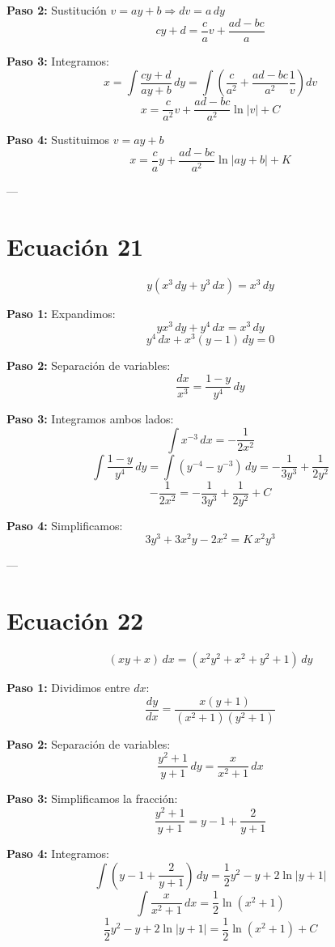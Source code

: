 \documentclass[12pt,a4paper]{article}
\begin{document}
\begin{multicols}{2}
	\textbf{Paso 2:} Sustitución \(v = a y + b \Rightarrow dv = a\,dy\)
	\[
	c y + d = \frac{c}{a}v + \frac{ad - bc}{a}
	\]
	
	\textbf{Paso 3:} Integramos:
	\[
	x = \int \frac{c y + d}{a y + b}\,dy 
	= \int \left( \frac{c}{a^2} + \frac{ad - bc}{a^2}\frac{1}{v} \right) dv
	\]
	\[
	x = \frac{c}{a^2}v + \frac{ad - bc}{a^2}\ln|v| + C
	\]
	
	\textbf{Paso 4:} Sustituimos \(v = a y + b\)
	\[
	\boxed{x = \frac{c}{a}y + \frac{ad - bc}{a^2}\ln|a y + b| + K}
	\]
	
	---
	
	\section*{Ecuación 21}
	\[
	y(x^3\,dy + y^3\,dx) = x^3\,dy
	\]
	
	\textbf{Paso 1:} Expandimos:
	\[
	y x^3\,dy + y^4\,dx = x^3\,dy
	\]
	\[
	y^4\,dx + x^3(y - 1)\,dy = 0
	\]
	
	\textbf{Paso 2:} Separación de variables:
	\[
	\frac{dx}{x^3} = \frac{1 - y}{y^4}\,dy
	\]
	
	\textbf{Paso 3:} Integramos ambos lados:
	\[
	\int x^{-3}\,dx = -\frac{1}{2x^2}
	\]
	\[
	\int \frac{1 - y}{y^4}\,dy = \int(y^{-4} - y^{-3})\,dy = -\frac{1}{3y^3} + \frac{1}{2y^2}
	\]
	\[
	-\frac{1}{2x^2} = -\frac{1}{3y^3} + \frac{1}{2y^2} + C
	\]
	
	\textbf{Paso 4:} Simplificamos:
	\[
	\boxed{3y^3 + 3x^2y - 2x^2 = K\,x^2y^3}
	\]
	
	---
	
	\section*{Ecuación 22}
	\[
	(xy + x)\,dx = (x^2y^2 + x^2 + y^2 + 1)\,dy
	\]
	
	\textbf{Paso 1:} Dividimos entre \(dx\):
	\[
	\frac{dy}{dx} = \frac{x(y + 1)}{(x^2 + 1)(y^2 + 1)}
	\]
	
	\textbf{Paso 2:} Separación de variables:
	\[
	\frac{y^2 + 1}{y + 1}\,dy = \frac{x}{x^2 + 1}\,dx
	\]
	
	\textbf{Paso 3:} Simplificamos la fracción:
	\[
	\frac{y^2 + 1}{y + 1} = y - 1 + \frac{2}{y + 1}
	\]
	
	\textbf{Paso 4:} Integramos:
	\[
	\int (y - 1 + \frac{2}{y + 1})\,dy = \frac{1}{2}y^2 - y + 2\ln|y + 1|
	\]
	\[
	\int \frac{x}{x^2 + 1}\,dx = \frac{1}{2}\ln(x^2 + 1)
	\]
	\[
	\frac{1}{2}y^2 - y + 2\ln|y + 1| = \frac{1}{2}\ln(x^2 + 1) + C
	\]
	

\end{multicols}
\end{document}
